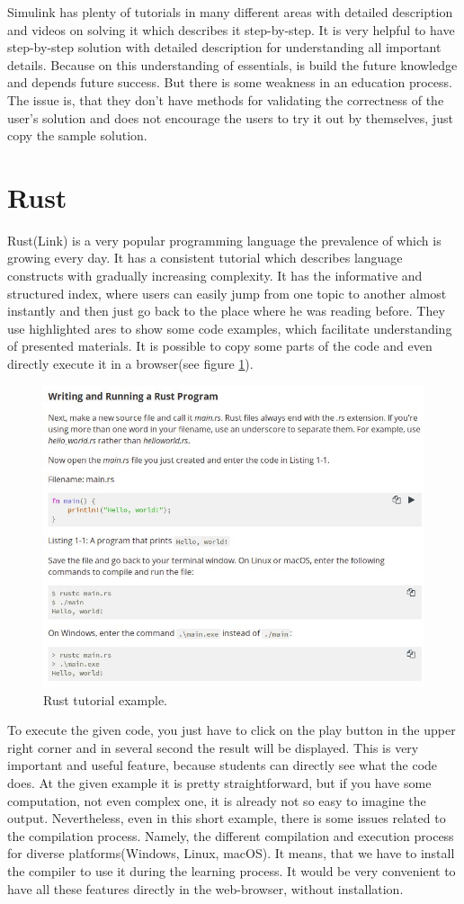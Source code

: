 Simulink has plenty of tutorials in many different areas with detailed description and videos on solving it which describes it step-by-step. It is very helpful to have step-by-step solution with detailed description for understanding all important details. Because on this understanding of essentials, is build the future knowledge and depends future success. But there is some weakness in an education process. The issue is, that they don't have methods for validating the correctness of the user's solution and does not encourage the users to try it out by themselves, just copy the sample solution.

\section{Rust} \label{sec:rust}
Rust(Link) is a very popular programming language the prevalence of which is growing every day. It has a consistent tutorial which describes language constructs with gradually increasing complexity. It has the informative and structured index, where users can easily jump from one topic to another almost instantly and then just go back to the place where he was reading before. They use highlighted ares to show some code examples, which facilitate understanding of presented materials. It is possible to copy some parts of the code and even directly execute it in a browser(see figure \ref{fig:rust}).

\begin{figure}[h!]
    \centering
    \includegraphics[width=0.7\linewidth]{src/pic/rust}
    \caption{Rust tutorial example.}
    \label{fig:rust}
\end{figure}

To execute the given code, you just have to click on the play button in the upper right corner and in several second the result will be displayed. This is very important and useful feature, because students can directly see what the code does. At the given example it is pretty straightforward, but if you have some computation, not even complex one, it is already not so easy to imagine the output.
Nevertheless, even in this short example, there is some issues related to the compilation process. Namely, the different compilation and execution process for diverse platforms(Windows, Linux, macOS). It means, that we have to install the compiler to use it during the learning process. It would be very convenient to have all these features directly in the web-browser, without installation.

